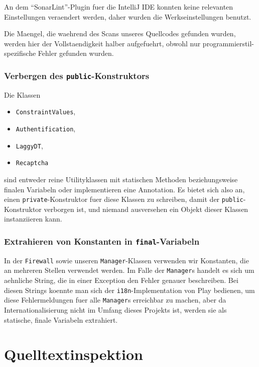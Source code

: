 \documentclass[12pt,DIV14,BCOR10mm,a4paper,twoside,parskip=half-,headsepline,headinclude,english,ngerman,bibliography=totocnumbered]{scrreprt}
\begin{document}
An dem \enquote{SonarLint}-Plugin fuer die IntelliJ IDE konnten keine relevanten Einstellungen veraendert werden, daher wurden die Werkseinstellungen benutzt.

Die Maengel, die waehrend des Scans unseres Quellcodes gefunden wurden, werden hier der Vollstaendigkeit halber aufgefuehrt, obwohl nur programmierstil-spezifische Fehler gefunden wurden.

\subsubsection{Verbergen des \texttt{public}-Konstruktors}

Die Klassen

\begin{itemize}
  \item \texttt{ConstraintValues},
  \item \texttt{Authentification},
  \item \texttt{LaggyDT},
  \item \texttt{Recaptcha}
\end{itemize}

sind entweder reine Utilityklassen mit statischen Methoden beziehungsweise finalen Variabeln oder implementieren eine Annotation.
Es bietet sich also an, einen \texttt{private}-Konstruktor fuer diese Klassen zu schreiben, damit der \texttt{public}-Konstruktor verborgen ist, und niemand ausversehen ein Objekt dieser Klassen instanziieren kann.

\subsubsection{Extrahieren von Konstanten in \texttt{final}-Variabeln}

In der \texttt{Firewall} sowie unseren \texttt{Manager}-Klassen verwenden wir Konstanten, die an mehreren Stellen verwendet werden.
Im Falle der \texttt{Manager}s handelt es sich um aehnliche String, die in einer Exception den Fehler genauer beschreiben.
Bei diesen Strings koennte man sich der \texttt{i18n}-Implementation von Play bedienen, um diese Fehlermeldungen fuer alle \texttt{Manager}s erreichbar zu machen, aber da Internationalisierung nicht im Umfang dieses Projekts ist, werden sie als statische, finale Variabeln extrahiert.

\section{Quelltextinspektion}
\end{document}
